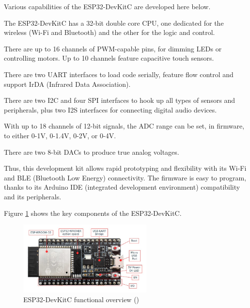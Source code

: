 \medskip Various capabilities of the ESP32-DevKitC are developed here below.

\begin{description}[align=left]
    \item[CPU architecture] The ESP32-DevKitC has a 32-bit double core CPU, one dedicated for the wireless (Wi-Fi and Bluetooth) and the other for the logic and control.
    \item[GPIO pins] There are up to 16 channels of PWM-capable pins, for dimming LEDs or controlling motors. Up to 10 channels feature capacitive touch sensors.
    \item[UART] There are two UART interfaces to load code serially, feature flow control and support IrDA (Infrared Data Association).
    \item[I2C, SPI, I2S] There are two I2C and four SPI interfaces to hook up all types of sensors and peripherals, plus two I2S interfaces for connecting digital audio devices.
    \item[Analog-to-Digital Converter (ADC)] With up to 18 channels of 12-bit signals, the ADC range can be set, in firmware, to either 0-1V, 0-1.4V, 0-2V, or 0-4V.
    \item[Digital-to-Analog Converter (DAC)] There are two 8-bit DACs to produce true analog voltages.
\end{description}

\medskip Thus, this development kit allows rapid prototyping and flexibility with its Wi-Fi and BLE (Bluetooth Low Energy) connectivity. The firmware is easy to program, thanks to its Arduino IDE (integrated development environment) compatibility and its peripherals. 

\newpage Figure \ref{fig:ESP32-DevKitC_functional_overview} shows the key components of the ESP32-DevKitC.

\begin{figure}[H]
    \centering
    \includegraphics[width=0.6\textwidth]{images/EE_esp32-devkitc-functional-overview.jpg}
    \caption{ESP32-DevKitC functional overview (\cite{esp32gettingstartedguide})}
    \label{fig:ESP32-DevKitC_functional_overview}
\end{figure}

